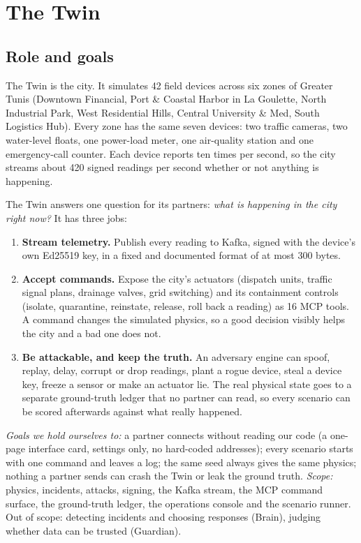 \documentclass[10pt,a4paper]{article}
\begin{document}
\setcounter{section}{0} %

\section{The Twin}

\subsection{Role and goals}
The Twin is the city. It simulates 42 field devices across six zones of Greater Tunis (Downtown Financial, Port \& Coastal Harbor in La Goulette, North Industrial Park, West Residential Hills, Central University \& Med, South Logistics Hub). Every zone has the same seven devices: two traffic cameras, two water-level floats, one power-load meter, one air-quality station and one emergency-call counter. Each device reports ten times per second, so the city streams about 420 signed readings per second whether or not anything is happening.

The Twin answers one question for its partners: \emph{what is happening in the city right now?} It has three jobs:
\begin{enumerate}[leftmargin=*,itemsep=0pt,topsep=1pt]
  \item \textbf{Stream telemetry.} Publish every reading to Kafka, signed with the device's own Ed25519 key, in a fixed and documented format of at most 300 bytes.
  \item \textbf{Accept commands.} Expose the city's actuators (dispatch units, traffic signal plans, drainage valves, grid switching) and its containment controls (isolate, quarantine, reinstate, release, roll back a reading) as 16 MCP tools. A command changes the simulated physics, so a good decision visibly helps the city and a bad one does not.
  \item \textbf{Be attackable, and keep the truth.} An adversary engine can spoof, replay, delay, corrupt or drop readings, plant a rogue device, steal a device key, freeze a sensor or make an actuator lie. The real physical state goes to a separate ground-truth ledger that no partner can read, so every scenario can be scored afterwards against what really happened.
\end{enumerate}
\textit{Goals we hold ourselves to:} a partner connects without reading our code (a one-page interface card, settings only, no hard-coded addresses); every scenario starts with one command and leaves a log; the same seed always gives the same physics; nothing a partner sends can crash the Twin or leak the ground truth.
\textit{Scope:} physics, incidents, attacks, signing, the Kafka stream, the MCP command surface, the ground-truth ledger, the operations console and the scenario runner. Out of scope: detecting incidents and choosing responses (Brain), judging whether data can be trusted (Guardian).
\end{document}
